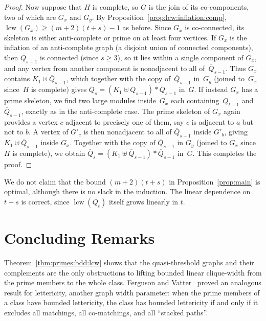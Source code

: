 \documentclass[10pt]{article}
\newcommand{\lcw}{\operatorname{lcw}}
\theoremstyle{plain}
\begin{document}
\begin{proof}
%
%
%

Now suppose that $H$ is complete, so $G$ is the join of its co-components, two of which are $G_x$ and $G_y$. By Proposition~\ref{prop:lcw:inflation:comp}, $\lcw(G_x)\ge (m+2)(t+s)-1$ as before. Since $G_x$ is co-connected, its skeleton is either anti-complete or prime on at least four vertices. If $G_x$ is the inflation of an anti-complete graph (a disjoint union of connected components), then $\overline{Q}_{s-1}$ is connected (since $s\ge 3$), so it lies within a single component of $G_x$, and any vertex from another component is nonadjacent to all of~$\overline{Q}_{s-1}$. Thus $G_x$ contains $K_1\uplus\overline{Q}_{s-1}$, which together with the copy of~$\overline{Q}_{s-1}$ in~$G_y$ (joined to~$G_x$ since~$H$ is complete) gives $\overline{Q}_s=(K_1\uplus\overline{Q}_{s-1})\ast\overline{Q}_{s-1}$ in~$G$. If instead $G_x$ has a prime skeleton, we find two large modules inside~$G_x$ each containing~$Q_{t-1}$ and~$\overline{Q}_{s-1}$, exactly as in the anti-complete case. The prime skeleton of $G_x$ again provides a vertex $c$ adjacent to precisely one of them, say $c$ is adjacent to $a$ but not to $b$. A vertex of $G'_c$ is then nonadjacent to all of $\overline{Q}_{s-1}$ inside $G'_b$, giving $K_1\uplus\overline{Q}_{s-1}$ inside $G_x$. Together with the copy of $\overline{Q}_{s-1}$ in $G_y$ (joined to $G_x$ since $H$ is complete), we obtain $\overline{Q}_s=(K_1\uplus\overline{Q}_{s-1})\ast\overline{Q}_{s-1}$ in~$G$. This completes the proof.
\end{proof}

We do not claim that the bound $(m+2)(t+s)$ in Proposition~\ref{prop:main} is optimal, although there is no slack in the induction. The linear dependence on $t+s$ is correct, since $\lcw(Q_t)$ itself grows linearly in $t$.

%
%
%
%
%

\section{Concluding Remarks}

Theorem~\ref{thm:primes:bdd:lcw} shows that the quasi-threshold graphs and their complements are the only obstructions to lifting bounded linear clique-width from the prime members to the whole class. Ferguson and Vatter~\cite[Theorem~5.1]{ferguson:letter-graphs-a:} proved an analogous result for lettericity, another graph width parameter: when the prime members of a class have bounded lettericity, the class has bounded lettericity if and only if it excludes all matchings, all co-matchings, and all ``stacked paths''.
\end{document}
